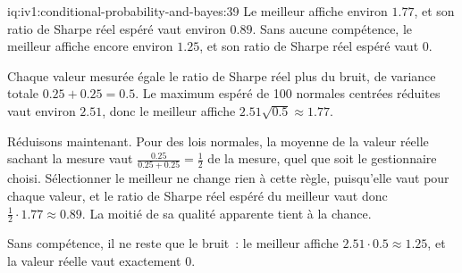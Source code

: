\begin{solution}{iq:iv1:conditional-probability-and-bayes:39}
Le meilleur affiche environ $1.77$, et son ratio de Sharpe réel espéré vaut environ $0.89$. Sans aucune compétence, le meilleur affiche encore environ $1.25$, et son ratio de Sharpe réel espéré vaut 0.

Chaque valeur mesurée égale le ratio de Sharpe réel plus du bruit, de variance totale $0.25 + 0.25 = 0.5$. Le maximum espéré de 100 normales centrées réduites vaut environ $2.51$, donc le meilleur affiche $2.51\sqrt{0.5} \approx 1.77$.

Réduisons maintenant. Pour des lois normales, la moyenne de la valeur réelle sachant la mesure vaut $\tfrac{0.25}{0.25 + 0.25} = \tfrac12$ de la mesure, quel que soit le gestionnaire choisi. Sélectionner le meilleur ne change rien à cette règle, puisqu'elle vaut pour chaque valeur, et le ratio de Sharpe réel espéré du meilleur vaut donc $\tfrac12 \cdot 1.77 \approx 0.89$. La moitié de sa qualité apparente tient à la chance.

Sans compétence, il ne reste que le bruit~: le meilleur affiche $2.51 \cdot 0.5 \approx 1.25$, et la valeur réelle vaut exactement 0.

\end{solution}

